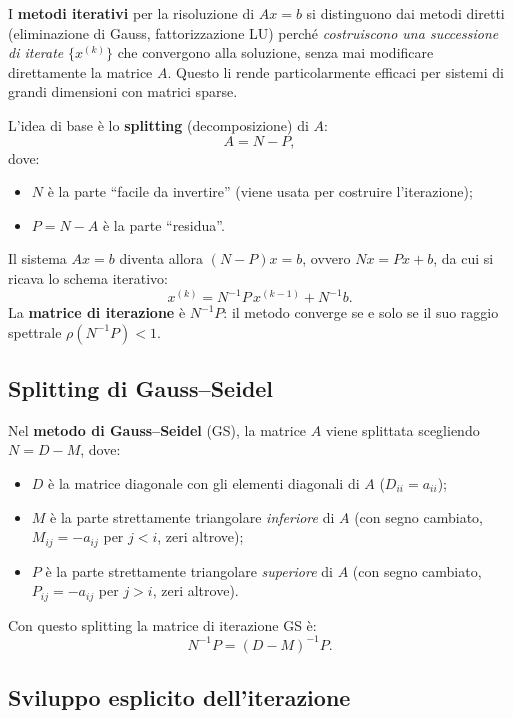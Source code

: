 \documentclass[a4paper,12pt]{article}
\theoremstyle{definition}
\theoremstyle{remark}
\begin{document}
I \textbf{metodi iterativi} per la risoluzione di $Ax = b$ si distinguono
dai metodi diretti (eliminazione di Gauss, fattorizzazione LU) perché
\emph{costruiscono una successione di iterate} $\{x^{(k)}\}$ che convergono
alla soluzione, senza mai modificare direttamente la matrice $A$.
Questo li rende particolarmente efficaci per sistemi di grandi dimensioni
con matrici sparse.

L'idea di base è lo \textbf{splitting} (decomposizione) di $A$:
\[
  A = N - P,
\]
dove:
\begin{itemize}
  \item $N$ è la parte ``facile da invertire'' (viene usata per costruire
        l'iterazione);
  \item $P = N - A$ è la parte ``residua''.
\end{itemize}
Il sistema $Ax = b$ diventa allora $(N - P)x = b$, ovvero $Nx = Px + b$,
da cui si ricava lo schema iterativo:
\[
  x^{(k)} = N^{-1}P\,x^{(k-1)} + N^{-1}b.
\]
La \textbf{matrice di iterazione} è $N^{-1}P$: il metodo converge se e
solo se il suo raggio spettrale $\rho(N^{-1}P) < 1$.

\subsection{Splitting di Gauss--Seidel}

Nel \textbf{metodo di Gauss--Seidel} (GS), la matrice $A$ viene splittata
scegliendo $N = D - M$, dove:
\begin{itemize}
  \item $D$ è la matrice diagonale con gli elementi diagonali di $A$
        ($D_{ii} = a_{ii}$);
  \item $M$ è la parte strettamente triangolare \emph{inferiore} di $A$
        (con segno cambiato, $M_{ij} = -a_{ij}$ per $j < i$, zeri altrove);
  \item $P$ è la parte strettamente triangolare \emph{superiore} di $A$
        (con segno cambiato, $P_{ij} = -a_{ij}$ per $j > i$, zeri altrove).
\end{itemize}
Con questo splitting la matrice di iterazione GS è:
\[
  N^{-1}P = (D-M)^{-1}P.
\]

\subsection{Sviluppo esplicito dell'iterazione}
\end{document}
